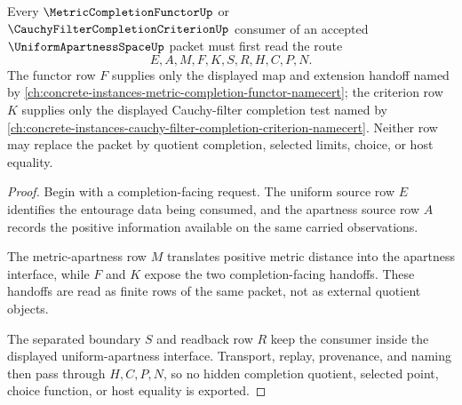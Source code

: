 \begin{theorem}
\label{thm:uniform-apartness-space-completion-filter-handoff}
Every $\MetricCompletionFunctorUp$ or
$\CauchyFilterCompletionCriterionUp$ consumer of an accepted
$\UniformApartnessSpaceUp$ packet must first read the route
$$
E,A,M,F,K,S,R,H,C,P,N .
$$
The functor row $F$ supplies only the displayed map and extension handoff
named by
\autoref{ch:concrete-instances-metric-completion-functor-namecert}; the
criterion row $K$ supplies only the displayed Cauchy-filter completion test
named by
\autoref{ch:concrete-instances-cauchy-filter-completion-criterion-namecert}.
Neither row may replace the packet by quotient completion, selected limits,
choice, or host equality.
\end{theorem}
\begin{proof}
Begin with a completion-facing request. The uniform source row $E$ identifies
the entourage data being consumed, and the apartness source row $A$ records
the positive information available on the same carried observations.

The metric-apartness row $M$ translates positive metric distance into the
apartness interface, while $F$ and $K$ expose the two completion-facing
handoffs. These handoffs are read as finite rows of the same packet, not as
external quotient objects.

The separated boundary $S$ and readback row $R$ keep the consumer inside the
displayed uniform-apartness interface. Transport, replay, provenance, and
naming then pass through $H,C,P,N$, so no hidden completion quotient,
selected point, choice function, or host equality is exported.
\end{proof}

